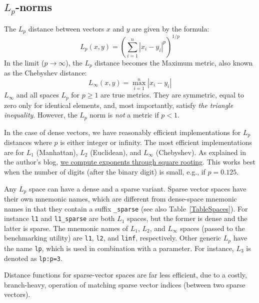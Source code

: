 \documentclass[runningheads,a4paper]{llncs}
\newcommand{\ttt}[1]{\texttt{#1}}
\begin{document}
{\subsection{$L_p$-norms}\label{SectionLP}
The $L_p$ distance between vectors $x$ and $y$ are
given by the formula:
\begin{equation}\label{EqMink}
L_p(x,y) = \left(\sum_{i=1}^n |x_i-y_i|^p\right)^{1/p}
\end{equation}
In the limit ($p \rightarrow \infty$),
the $L_p$ distance becomes the Maximum metric, also known as 
the Chebyshev distance:
\begin{equation}\label{EqCheb}
L_{\infty}(x,y) = \max\limits_{i=1}^n |x_i-y_i|
\end{equation}
$L_{\infty}$ and all spaces $L_p$ for $p \ge 1$
are true metrics. 
They are symmetric, equal to zero only for identical elements,
and, most importantly, satisfy \emph{the triangle inequality}.
However, the $L_p$ norm is \emph{not} a metric if $p<1$.

In the case of dense vectors, 
we have reasonably efficient implementations 
for $L_p$ distances where $p$ is either integer or infinity. 
The most efficient implementations are for $L_1$ (Manhattan),
$L_2$ (Euclidean), and $L_{\infty}$ (Chebyshev).
As explained in the author's blog,
\href{http://searchivarius.org/blog/efficient-exponentiation-square-rooting}{we compute exponents through square rooting}. 
This works best when the number of digits (after the binary digit) is small, e.g., if $p=0.125$.

Any $L_p$ space can have a dense and a sparse variant.
Sparse vector spaces have their own mnemonic names, which are different
from dense-space mnemonic names in that they contain a suffix \ttt{\_sparse} (see also Table~\ref{TableSpaces}).
For instance \ttt{l1} and \ttt{l1\_sparse} are both $L_1$ spaces,
but the former is dense and the latter is sparse.
The mnemonic names of $L_1$, $L_2$, and $L_\infty$ spaces (passed to the benchmarking utility) are
\ttt{l1}, \ttt{l2}, and \ttt{linf}, respectively.
Other generic $L_p$ have the name \ttt{lp}, which is used in combination with a parameter.
For instance, $L_3$ is denoted as \ttt{lp:p=3}.

Distance functions for sparse-vector spaces are far less efficient, 
due to a costly, branch-heavy, operation of matching sparse vector indices
(between two sparse vectors).

}
\end{document}
